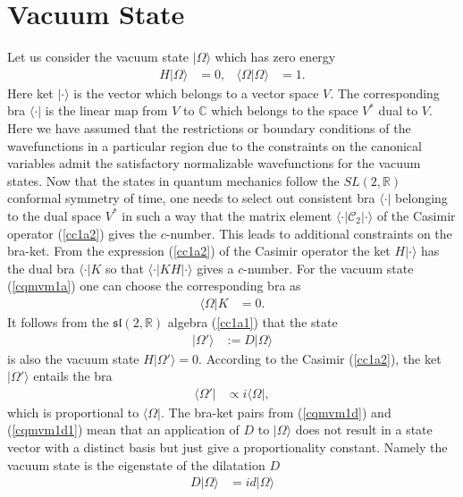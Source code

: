 \documentclass[12pt]{article}
\numberwithin{equation}{section}
\begin{document}
\section{Vacuum State}
\label{vsubsec}
Let us consider the vacuum state $|\Omega\rangle$ 
which has zero energy
\begin{align}
\label{cqmvm1a}
H|\Omega\rangle&=0, & \langle \Omega|\Omega\rangle&=1. 
\end{align}
Here ket $|\cdot \rangle$ is the vector which belongs to a vector space $V$. 
The corresponding bra $\langle\cdot |$ is the linear map from $V$ to $\mathbb{C}$ 
which belongs to the space $V^{*}$ dual to $V$. 
Here we have assumed that 
the restrictions or boundary conditions of the wavefunctions in a particular region  
due to the constraints on the canonical variables admit the satisfactory normalizable wavefunctions 
for the vacuum states. 
Now that the states in quantum mechanics follow 
the $SL(2,\mathbb{R})$ conformal symmetry of time, 
one needs to select out consistent bra $\langle \cdot |$ belonging to the dual space $V^{*}$ 
in such a way that the matrix element 
$\langle \cdot |\mathcal{C}_{2}|\cdot \rangle$ 
of the Casimir operator (\ref{cc1a2}) 
gives the $c$-number. 
This leads to additional constraints on the bra-ket. 
From the expression (\ref{cc1a2}) of the Casimir operator 
the ket $H|\cdot\rangle$ has the dual bra $\langle\cdot |K$ 
so that $\langle \cdot|KH|\cdot\rangle$ gives a $c$-number. 
For the vacuum state (\ref{cqmvm1a}) 
one can choose the corresponding bra as 
\begin{align}
\label{cqmvm1b}
\langle \Omega|K&=0.
\end{align}
%
It follows from the $\mathfrak{sl}(2,\mathbb{R})$ algebra (\ref{cc1a1}) 
that the state 
\begin{align}
\label{cqmvm1d}
|\Omega'\rangle&:=D|\Omega\rangle
\end{align}
is also the vacuum state 
$H|\Omega'\rangle=0$.
According to the Casimir (\ref{cc1a2}), 
the ket $|\Omega'\rangle$ entails the bra 
\begin{align}
\label{cqmvm1d1}
\langle \Omega'|&\propto i\langle \Omega|,
\end{align}
which is proportional to $\langle \Omega|$. 
The bra-ket pairs from (\ref{cqmvm1d}) and (\ref{cqmvm1d1}) mean that 
an application of $D$ to $|\Omega\rangle$ does not result in 
a state vector with a distinct basis 
but just give a proportionality constant. 
Namely the vacuum state is the eigenstate of the dilatation $D$
\begin{align}
\label{cqmvm3a}
D|\Omega\rangle&=id|\Omega\rangle
\end{align}
\end{document}
